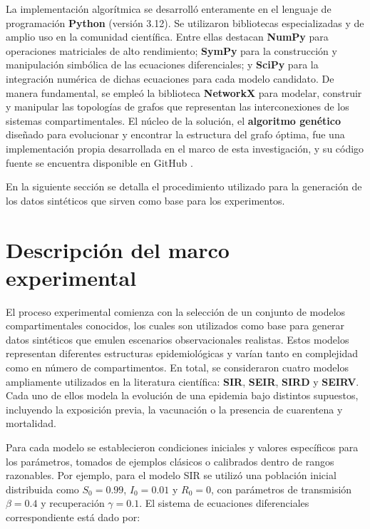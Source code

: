 La implementación algorítmica se desarrolló enteramente en el lenguaje de programación \textbf{Python} (versión 3.12). Se utilizaron bibliotecas especializadas y de amplio uso en la comunidad científica. Entre ellas destacan \textbf{NumPy} \cite{2020NumPy-Array} para operaciones matriciales de alto rendimiento; \textbf{SymPy} \cite{Meurer_SymPy_symbolic_computing_2017} para la construcción y manipulación simbólica de las ecuaciones diferenciales; y \textbf{SciPy} \cite{2020SciPy-NMeth} para la integración numérica de dichas ecuaciones para cada modelo candidato. De manera fundamental, se empleó la biblioteca \textbf{NetworkX} \cite{networkx} para modelar, construir y manipular las topologías de grafos que representan las interconexiones de los sistemas compartimentales. El núcleo de la solución, el \textbf{algoritmo genético} diseñado para evolucionar y encontrar la estructura del grafo óptima, fue una implementación propia desarrollada en el marco de esta investigación, y su código fuente se encuentra disponible en GitHub \cite{comparmentalodesystem2025}.

En la siguiente sección se detalla el procedimiento utilizado para la generación de los datos sintéticos que sirven como base para los experimentos.

\section{Descripci\'on del marco experimental}
\label{sec:experimentation2}

El proceso experimental comienza con la selección de un conjunto de modelos compartimentales conocidos, los cuales son utilizados como base para generar datos sintéticos que emulen escenarios observacionales realistas. Estos modelos representan diferentes estructuras epidemiológicas y varían tanto en complejidad como en número de compartimentos. En total, se consideraron cuatro modelos ampliamente utilizados en la literatura científica: \textbf{SIR}, \textbf{SEIR}, \textbf{SIRD} y \textbf{SEIRV}. Cada uno de ellos modela la evolución de una epidemia bajo distintos supuestos, incluyendo la exposición previa, la vacunación o la presencia de cuarentena y mortalidad.

Para cada modelo se establecieron condiciones iniciales y valores específicos para los parámetros, tomados de ejemplos clásicos o calibrados dentro de rangos razonables. Por ejemplo, para el modelo SIR se utilizó una población inicial distribuida como \( S_0 = 0.99 \), \( I_0 = 0.01 \) y \( R_0 = 0 \), con parámetros de transmisión \( \beta = 0.4 \) y recuperación \( \gamma = 0.1 \). El sistema de ecuaciones diferenciales correspondiente está dado por:

